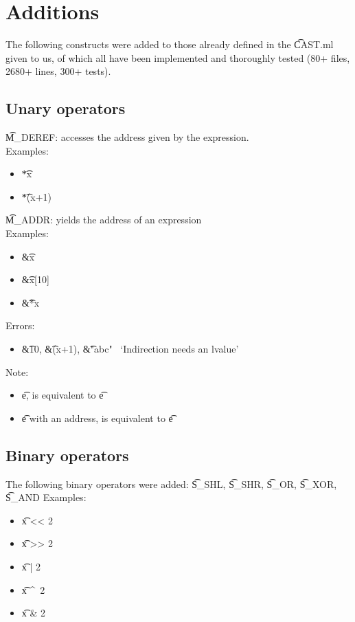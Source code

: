 \section{Additions}

The following constructs were added to those already defined in the \t{CAST.ml} given to us, of which all have been implemented and thoroughly tested (80+ files, 2680+ lines, 300+ tests).

\subsection{Unary operators}
\t{M\_DEREF}: accesses the address given by the expression.\\
Examples:
\begin{itemize}
    \item \t{*x} \to\ 
    \item \t{*(x+1)} \to\ 
\end{itemize}

\t{M\_ADDR}: yields the address of an expression\\
Examples:
\begin{itemize}
    \item \t{\&x} \to\ 
    \item \t{\&x[10]} \to\ 
    \item \t{\&*x} \to\ 
\end{itemize}
Errors:
\begin{itemize}
    \item \t{\&10}, \t{\&(x+1)}, \t{\&"abc"} \to\ `Indirection needs an lvalue'
\end{itemize}

Note:
\begin{itemize}
    \item \forall \t{e},  is equivalent to \t{e}
    \item \forall \t{e} with an address,  is equivalent to \t{e}
\end{itemize}


\subsection{Binary operators}
The following binary operators were added:
\t{S\_SHL}, \t{S\_SHR}, \t{S\_OR}, \t{S\_XOR}, \t{S\_AND}
Examples:
\begin{itemize}
    \item \t{x << 2} \to\ 
    \item \t{x >> 2} \to\ 
    \item \t{x | 2} \to\ 
    \item \t{x \textasciicircum\ 2} \to\ 
    \item \t{x \& 2} \to\ 
\end{itemize}

